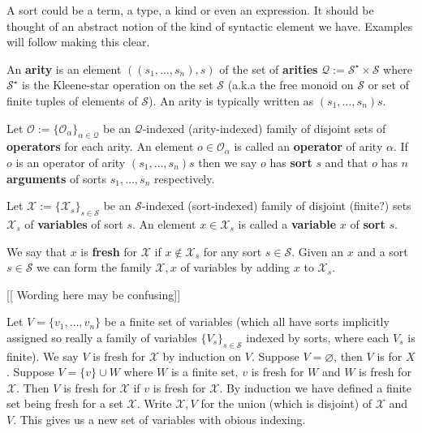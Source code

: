A sort could be a term, a type, a kind or even an expression. It should be thought of an abstract notion of the kind of syntactic element we have. Examples will follow making this clear.

\begin{defin}[Arities]
    An \textbf{arity} is an element $((s_1,\dots,s_n),s)$ of the set of \textbf{arities} $\mathcal{Q}:=\mathcal{S}^\star \times \mathcal{S}$ where $\mathcal{S}^\star$ is the Kleene-star operation on the set $\mathcal{S}$ (a.k.a the free monoid on $\mathcal{S}$ or set of finite tuples of elements of $\mathcal{S}$). An arity is typically written as $(s_1,\dots,s_n)s$. 
\end{defin}

\begin{defin}[Operators]
    Let $\mathcal{O} :=\{ \mathcal{O}_\alpha \}_{\alpha \in \mathcal{Q}}$ be an $\mathcal{Q}$-indexed (arity-indexed) family of disjoint sets of \textbf{operators} for each arity. An element $o \in \mathcal{O}_\alpha$ is called an \textbf{operator} of arity $\alpha$. If $o$ is an operator of arity $(s_1,\dots,s_n)s$ then we say $o$ has \textbf{sort} $s$ and that $o$ has $n$ \textbf{arguments} of sorts $s_1,\dots,s_n$ respectively.
\end{defin}

\begin{defin}[Variables]
    Let $\mathcal{X}:= \{ \mathcal{X}_s\}_{s \in \mathcal{S}}$ be an $\mathcal{S}$-indexed (sort-indexed) family of disjoint (finite?) sets $\mathcal{X}_s$ of \textbf{variables} of sort $s$. An element $x\in\mathcal{X}_s$ is called a \textbf{variable} $x$ of \textbf{sort} $s$. 
\end{defin}

\begin{defin}
    We say that $x$ is \textbf{fresh} for $\mathcal{X}$ if $x \not\in \mathcal{X}_s$ for any sort $s\in \mathcal{S}$. Given an $x$ and a sort $s\in \mathcal{S}$ we can form the family $\mathcal{X},x$ of variables by adding $x$ to $\mathcal{X}_s$. 
\end{defin}


[[ Wording here may be confusing]]
\begin{defin}
    Let $V=\{ v_1 ,\dots, v_n\}$ be a finite set of variables (which all have sorts implicitly assigned so really a family of variables $\{V_s\}_{s\in\mathcal{S}}$ indexed by sorts, where each $V_s$ is finite). We say $V$ is fresh for $\mathcal{X}$ by induction on $V$. Suppose $V=\varnothing$, then $V$ is  for $X$. Suppose $V = \{v \} \cup W$ where $W$ is a finite set, $v$ is fresh for $W$ and $W$ is fresh for $\mathcal{X}$. Then $V$ is fresh for $\mathcal{X}$ if $v$ is fresh for $\mathcal{X}$. By induction we have defined a finite set being fresh for a set $\mathcal{X}$. Write $\mathcal{X},V$ for the union (which is disjoint) of $\mathcal{X}$ and $V$. This gives us a new set of variables with obious indexing.
\end{defin}

